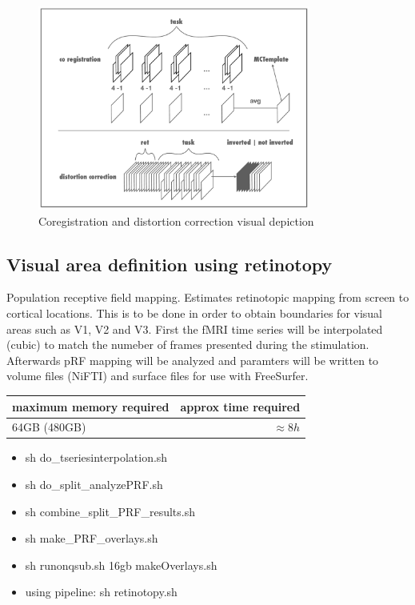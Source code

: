 \documentclass[12pt,a4paper]{scrartcl}
\begin{document}
\begin{figure}
\begin{center}
\includegraphics[width=0.8\textwidth]{coregdist}
\caption[Coregistration and distortion correction visual depiction]{Coregistration and distortion correction visual depiction}
\end{center}
\label{fig:coregdist}
\end{figure}

\subsection{Visual area definition using retinotopy}
Population receptive field mapping. Estimates retinotopic mapping from screen to cortical locations. This is to be done in order to obtain boundaries for visual areas such as V1, V2 and V3. First the fMRI time series will be interpolated (cubic) to match the numeber of frames presented during the stimulation. Afterwards pRF mapping will be analyzed and paramters will be written to volume files (NiFTI) and surface files for use with FreeSurfer.
\begin{table}[h]
\begin{tabular}{l | r}
\toprule
maximum memory required & approx time required\\\toprule
64GB (480GB) & $\approx 8h$ \\\bottomrule
\end{tabular}
\end{table}
\begin{itemize}
\item sh do\_tseriesinterpolation.sh
\item sh do\_split\_analyzePRF.sh
\item sh combine\_split\_PRF\_results.sh
\item sh make\_PRF\_overlays.sh
\item sh runonqsub.sh 16gb makeOverlays.sh
\item using pipeline: sh retinotopy.sh
\end{itemize}
\end{document}

